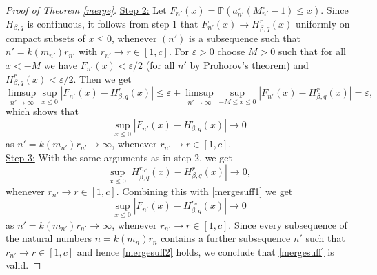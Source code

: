 \documentclass[10pt,a4paper]{amsart}
\newcommand{\Pm}{{\mathbb P}}
\newcommand{\eps}{{\varepsilon}}
\begin{document}
\begin{proof}[Proof of Theorem \ref{merge}]
\underline{Step 2:} Let $F_{n'}(x)=\Pm\left(a_{n'}^{\circ}(M_{n'}^{\circ}-1)\leq x\right)$. Since $H_{\beta,q}$ is continuous, it follows from step 1 that $F_{n'}(x)\to H_{\beta,q}^{r}(x)$ uniformly on compact subsets of $x\leq0$, whenever $(n')$ is a subsequence such that $n'=k(m_{n'})r_{n'}$ with $r_{n'}\to r\in[1,c]$. For $\eps>0$ choose $M>0$ such that for all $x<-M$ we have $F_{n'}(x)<\eps/2$ (for all $n'$ by Prohorov's theorem) and $H_{\beta,q}^{r}(x)<\eps/2$. Then we get
$$\limsup_{n'\to\infty}\sup_{x\leq0}\left|F_{n'}(x)-H_{\beta,q}^{r}(x)\right|\leq\eps+\limsup_{n'\to\infty}\sup_{-M\leq x\leq0}\left|F_{n'}(x)-H_{\beta,q}^{r}(x)\right|=\eps,$$
which shows that
\begin{equation}\label{mergesuff1}
\sup_{x\leq0}\left|F_{n'}(x)-H^{r}_{\beta,q}(x)\right|\to0
\end{equation}
as $n'=k(m_{n'})r_{n'}\to\infty$, whenever $r_{n'}\to r\in[1,c]$.\\[1ex]

\underline{Step 3:} With the same arguments as in step 2, we get
\begin{equation*}
\sup_{x\leq0}\left|H^{r_{n'}}_{\beta,q}(x)-H^{r}_{\beta,q}(x)\right|\to0,
\end{equation*}
whenever $r_{n'}\to r\in[1,c]$. Combining this with \eqref{mergesuff1} we get
\begin{equation}\label{mergesuff2}
\sup_{x\leq0}\left|F_{n'}(x)-H^{r_{n'}}_{\beta,q}(x)\right|\to0
\end{equation}
as $n'=k(m_{n'})r_{n'}\to\infty$, whenever $r_{n'}\to r\in[1,c]$. Since every subsequence of the natural numbers $n=k(m_{n})r_{n}$ contains a further subsequence $n'$ such that $r_{n'}\to r\in[1,c]$ and hence \eqref{mergesuff2} holds, we conclude that \eqref{mergesuff} is valid.
\end{proof}
\end{document}
